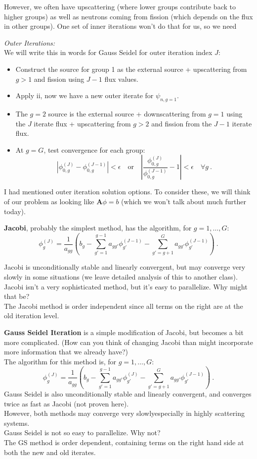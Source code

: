 \documentclass[12pt]{article}
\newcommand{\ve}[1]{\ensuremath{\mathbf{#1}}}
\begin{document}
%
However, we often have upscattering (where lower groups contribute back to higher groups) as well as neutrons coming from fission (which depends on the flux in other groups). One set of inner iterations won't do that for us, so we need 


\textit{Outer Iterations:} \\
We will write this in words for Gauss Seidel for outer iteration index $J$:
%
\begin{itemize}
\item Construct the source for group 1 as the external source + upscattering from $g>1$ and fission using $J-1$ flux values.
\item Apply ii, now we have a new outer iterate for $\psi_{n,g=1}$.
\item The $g=2$ source is the external source + downscattering from $g=1$ using the $J$ iterate flux + upscattering from $g>2$ and fission from the $J-1$ iterate flux. 
\item At $g=G$, test convergence for each group:
\[
|\phi_{0,g}^{(J)} - \phi_{0,g}^{(J-1)}| < \epsilon \quad \text{or} \quad |\frac{\phi_{0,g}^{(J)}}{\phi_{0,g}^{(J-1)}} - 1| < \epsilon \quad \forall g \:.
\]
\end{itemize}
I had mentioned outer iteration solution options. To consider these, we will think of our problem as looking like $\ve{A} \phi = b$ (which we won't talk about much further today).

\textbf{Jacobi}, probably the simplest method, has the algorithm, for $g = 1, \dots, G$:
\[\phi^{(J)}_g = \frac{1}{a_{gg}}(b_g - \sum_{g'=1}^{g-1} a_{gg'} \phi_{g'}^{(J-1)} - \sum_{g'=g+1}^{G} a_{gg'} \phi_{g'}^{(J-1)})\:.\]

Jacobi is unconditionally stable and linearly convergent, but may converge very slowly in some situations (we leave detailed analysis of this to another class). \\
Jacobi isn't a very sophisticated method, but it's easy to parallelize. Why might that be? \\The Jacobi method is order independent since all terms on the right are at the old iteration level. 

\textbf{Gauss Seidel Iteration} is a simple modification of Jacobi, but becomes a bit more complicated. (How can you think of changing Jacobi than might incorporate more information that we already have?)\\
The algorithm for this method is, for $g = 1, \dots, G$:
\[ \phi^{(J)}_g = \frac{1}{a_{gg}}(b_g - \sum_{g'=1}^{g-1} a_{gg'} \phi_{g'}^{(J)} - \sum_{g'=g+1}^{G} a_{gg'} \phi_{g'}^{(J-1)}) \:.\]
%
Gauss Seidel is also unconditionally stable and linearly convergent, and 
converges twice as fast as Jacobi (not proven here). \\
However, both methods may converge very slowly\textemdash especially in highly scattering systems.\\
Gauss Seidel is not so easy to parallelize. Why not? \\The GS method is order dependent, containing terms on the right hand side at both the new and old iterates.
\end{document}
